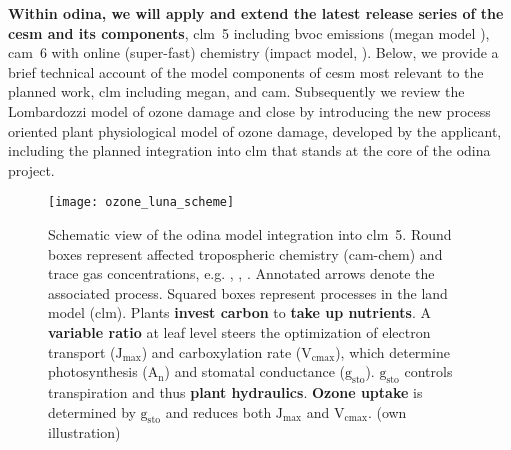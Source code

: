\textbf{Within \gls{odina}, we will apply and extend the latest release series of the \gls{cesm} and its components}, \gls{clm}~5 including \gls{bvoc} emissions (\gls{megan} model \parencite{ACP:Guenther2006}), \gls{cam}~6 with online (super-fast) chemistry (\gls{impact} model, \parencite{JGR:Rotman2004}). Below, we provide a brief technical account of the model components of \gls{cesm} most relevant to the planned work, \gls{clm} including \gls{megan}, and \gls{cam}. Subsequently we review the Lombardozzi model of ozone damage and close by introducing the new process oriented plant physiological model of ozone damage, developed by the applicant, including the planned integration into \gls{clm} that stands at the core of the \gls{odina} project.

\begin{figure}[!bh]
  \centering
  \texttt{[image: ozone\_luna\_scheme]} %
  \caption{Schematic view of the \gls{odina} model integration into \gls{clm}~5. Round boxes represent affected tropospheric chemistry (\gls{cam}-chem) and trace gas concentrations, e.g. \ch{[CO_2]}, \ch{[O_3]}, \ch{[H_2O]}. Annotated arrows denote the associated process. Squared boxes represent processes in the land model (\gls{clm}). Plants \textbf{\color{darkgray}invest carbon} to \textbf{\color{darkgray}take up nutrients}. A \textbf{\color{OliveGreen}variable  ratio} at leaf level steers the optimization of electron transport ($\mathrm{J_{max}}$) and carboxylation rate ($\mathrm{V_{cmax}}$), which determine photosynthesis ($\mathrm{A_n}$) and stomatal conductance ($\mathrm{g_{sto}}$). $\mathrm{g_{sto}}$ controls transpiration and thus \textbf{\color{blue}plant hydraulics}. \textbf{\color{red}Ozone uptake} is determined by $\mathrm{g_{sto}}$ and reduces both $\mathrm{J_{max}}$ and $\mathrm{V_{cmax}}$. (own illustration)}
  \label{fig:ozone_odina}
\end{figure}

\vspace{-0.5\baselineskip}

